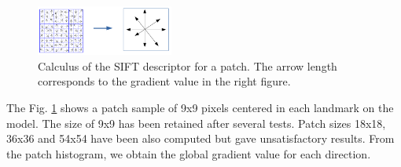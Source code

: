 \documentclass[twoside,twocolumn,10pt]{article}
\begin{document}
\begin{figure}[htb]
    \centering
    \includegraphics[width=0.4\textwidth]{./images/keypoint_descriptor}
    \caption{Calculus of the SIFT descriptor for a patch. The arrow length corresponds to the gradient value in the right figure.}
    \label{fig:kpdescriptor}
\end{figure}
The Fig. \ref{fig:kpdescriptor} shows a patch sample of 9x9 pixels centered in each landmark on the model.
The size of 9x9 has been retained after several tests.
Patch sizes 18x18, 36x36 and 54x54 have been also computed but gave unsatisfactory results.
From the patch histogram, we obtain the global gradient value for each direction.\\
\end{document}
